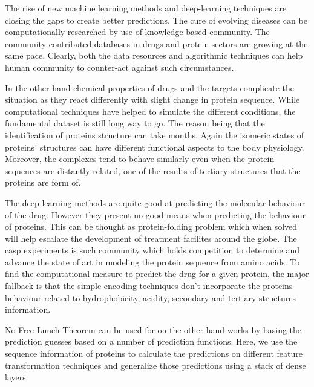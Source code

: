 The rise of new machine learning methods and deep-learning techniques are closing the gaps to create better predictions. The cure of evolving diseases can be computationally researched by use of knowledge-based community. The community contributed databases in drugs and protein sectors are growing at the same pace. Clearly, both the data resources and algorithmic techniques can help human community to counter-act against such circumstances.

In the other hand chemical properties of drugs and the targets complicate the situation as they react differently with slight change in protein sequence. While computational techniques have helped to simulate the different conditions, the fundamental dataset is still long way to go. The reason being that the identification of proteins structure can take months. Again the isomeric states of proteins' structures can have different functional aspects to the body physiology. Moreover, the complexes tend to behave similarly even when the protein sequences are distantly related, one of the results of tertiary structures that the proteins are form of.

The deep learning methods are quite good at predicting the molecular behaviour of the drug. However they present no good means when predicting the behaviour of proteins. This can be thought as protein-folding problem which when solved will help escalate the development of treatment facilites around the globe. The \acrshort{casp} experiments is such community which holds competition to determine and advance the state of art in modeling the protein sequence from amino acids. To find the computational measure to predict the drug for a given protein, the major fallback is that the simple encoding techniques don’t incorporate the proteins behaviour related to hydrophobicity, acidity, secondary and tertiary structures information.

No Free Lunch Theorem \cite{Wolpert2005} can be used for  on the other hand works by basing the prediction guesses based on a number of prediction functions. Here, we use the sequence information of proteins to calculate the predictions on different feature transformation techniques and generalize those predictions using a stack of dense layers.
